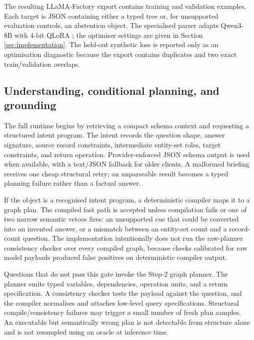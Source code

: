 The resulting LLaMA-Factory export contains \TrainN training and \ValN validation examples.
Each target is JSON containing either a typed tree or, for unsupported evaluation controls, an
abstention object.  The specialised parser adapts Qwen3-8B \citep{yang2025qwen3} with 4-bit QLoRA
\citep{dettmers2023qlora}; the optimiser settings are given in Section
\ref{sec:implementation}.  The held-out synthetic loss is reported only as an optimisation
diagnostic because the export contains duplicates and two exact train/validation overlaps.

\subsection{Understanding, conditional planning, and grounding}
\label{sec:understanding-planning}

The full runtime begins by retrieving a compact schema context and requesting a structured intent
program.  The intent records the question shape, answer signature, source record constraints,
intermediate entity-set roles, target constraints, and return operation.  Provider-enforced JSON
schema output is used when available, with a text/JSON fallback for older clients.  A malformed
briefing receives one cheap structural retry; an unparseable result becomes a typed planning
failure rather than a factual answer.

If the object is a recognised intent program, a deterministic compiler maps it to a graph plan.
The compiled fast path is accepted unless compilation fails or one of two narrow semantic vetoes
fires: an unsupported cue that could be converted into an invented answer, or a mismatch between
an entity-set count and a record-count question.  The implementation intentionally does not run
the raw-planner consistency checker over every compiled graph, because checks calibrated for raw
model payloads produced false positives on deterministic compiler output.

Questions that do not pass this gate invoke the Step-2 graph planner.  The planner emits typed
variables, dependencies, operation units, and a return specification.  A consistency checker
tests the payload against the question, and the compiler normalises and attaches low-level query
specifications.  Structural compile/consistency failures may trigger a small number of fresh
plan samples.  An executable but semantically wrong plan is not detectable from structure alone
and is not resampled using an oracle at inference time.


